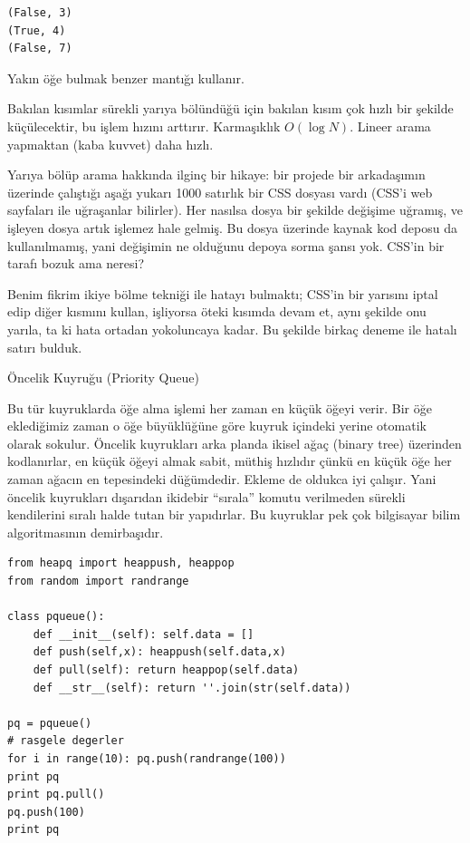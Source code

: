 \documentclass[12pt,fleqn]{article}\usepackage{../../common}
\begin{document}
\begin{verbatim}
(False, 3)
(True, 4)
(False, 7)
\end{verbatim}

Yakın öğe bulmak benzer mantığı kullanır. 

Bakılan kısımlar sürekli yarıya bölündüğü için bakılan kısım çok hızlı bir
şekilde küçülecektir, bu işlem hızını arttırır. Karmaşıklık $O(\log
N)$. Lineer arama yapmaktan (kaba kuvvet) daha hızlı. 

Yarıya bölüp arama hakkında ilginç bir hikaye: bir projede bir arkadaşımın
üzerinde çalıştığı aşağı yukarı 1000 satırlık bir CSS dosyası vardı (CSS'i
web sayfaları ile uğraşanlar bilirler). Her nasılsa dosya bir şekilde
değişime uğramış, ve işleyen dosya artık işlemez hale gelmiş. Bu dosya
üzerinde kaynak kod deposu da kullanılmamış, yani değişimin ne olduğunu
depoya sorma şansı yok. CSS'in bir tarafı bozuk ama neresi?

Benim fikrim ikiye bölme tekniği ile hatayı bulmaktı; CSS'in bir yarısını
iptal edip diğer kısmını kullan, işliyorsa öteki kısımda devam et, aynı
şekilde onu yarıla, ta ki hata ortadan yokoluncaya kadar. Bu şekilde birkaç
deneme ile hatalı satırı bulduk. 

Öncelik Kuyruğu (Priority Queue)

Bu tür kuyruklarda öğe alma işlemi her zaman en küçük öğeyi verir. Bir öğe
eklediğimiz zaman o öğe büyüklüğüne göre kuyruk içindeki yerine otomatik
olarak sokulur. Öncelik kuyrukları arka planda ikisel ağaç (binary tree)
üzerinden kodlanırlar, en küçük öğeyi almak sabit, müthiş hızlıdır çünkü en
küçük öğe her zaman ağacın en tepesindeki düğümdedir. Ekleme de oldukca iyi
çalışır. Yani öncelik kuyrukları dışarıdan ikidebir ``sırala'' komutu
verilmeden sürekli kendilerini sıralı halde tutan bir yapıdırlar. Bu
kuyruklar pek çok bilgisayar bilim algoritmasının demirbaşıdır.

\begin{verbatim}
from heapq import heappush, heappop
from random import randrange

class pqueue():
    def __init__(self): self.data = []
    def push(self,x): heappush(self.data,x)
    def pull(self): return heappop(self.data)
    def __str__(self): return ''.join(str(self.data))

pq = pqueue()
# rasgele degerler
for i in range(10): pq.push(randrange(100))
print pq
print pq.pull()
pq.push(100)
print pq
\end{verbatim}
\end{document}
